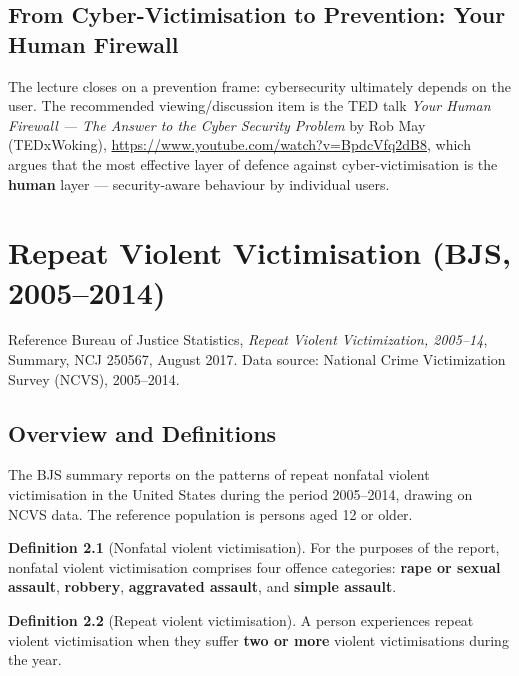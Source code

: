 \documentclass[11pt,a4paper,openany]{report}
\theoremstyle{definition}
\newtheorem{definition}{Definition}[chapter]
\theoremstyle{plain}
\theoremstyle{remark}
\begin{document}
\section{From Cyber-Victimisation to Prevention: Your Human Firewall}

The lecture closes on a prevention frame: cybersecurity ultimately depends on the user. The recommended viewing/discussion item is the TED talk \textit{Your Human Firewall --- The Answer to the Cyber Security Problem} by Rob May (TEDxWoking), \url{https://www.youtube.com/watch?v=BpdcVfq2dB8}, which argues that the most effective layer of defence against cyber-victimisation is the \textbf{human} layer --- security-aware behaviour by individual users.


\chapter{Repeat Violent Victimisation (BJS, 2005--2014)}
\label{chap:bjs}

\begin{sourcebox}{Reference}
Bureau of Justice Statistics, \textit{Repeat Violent Victimization, 2005--14}, Summary, NCJ 250567, August 2017. Data source: National Crime Victimization Survey (NCVS), 2005--2014.
\end{sourcebox}

\section{Overview and Definitions}

The BJS summary reports on the patterns of repeat nonfatal violent victimisation in the United States during the period 2005--2014, drawing on NCVS data. The reference population is persons aged 12 or older.

\begin{definition}[Nonfatal violent victimisation]
For the purposes of the report, nonfatal violent victimisation comprises four offence categories: \textbf{rape or sexual assault}, \textbf{robbery}, \textbf{aggravated assault}, and \textbf{simple assault}.
\end{definition}

\begin{definition}[Repeat violent victimisation]
A person experiences repeat violent victimisation when they suffer \textbf{two or more} violent victimisations during the year.
\end{definition}
\end{document}
